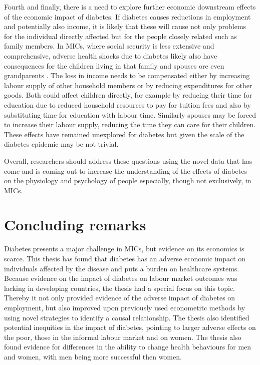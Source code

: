 Fourth and finally, there is a need to explore further economic downstream effects of the economic impact of diabetes. If diabetes causes reductions in employment and potentially also income, it is likely that these will cause not only problems for the individual directly affected but for the people closely related such as family members. In \acp{MIC}, where social security is less extensive and comprehensive, adverse health shocks due to diabetes likely also have consequences for the children living in that family and spouses ore even grandparents \parencite{Alam2014}. The loss in income needs to be compensated either by increasing labour supply of other household members or by reducing expenditures for other goods. Both could affect children directly, for example by reducing their time for education due to reduced household resources to pay for tuition fees and also by substituting time for education with labour time. Similarly spouses may be forced to increase their labour supply, reducing the time they can care for their children. These effects have remained unexplored for diabetes but given the scale of the diabetes epidemic may be not trivial.

Overall, researchers should address these questions using the novel data that has come and is coming out to increase the understanding of the effects of diabetes on the physiology and psychology of people especially, though not exclusively, in \acp{MIC}.


\section{Concluding remarks}

Diabetes presents a major challenge in \acp{MIC}, but evidence on its economics is scarce. This thesis has found that diabetes has an adverse economic impact on individuals affected by the disease and puts a burden on healthcare systems. Because evidence on the impact of diabetes on labour market outcomes was lacking in developing countries, the thesis had a special focus on this topic. Thereby it not only provided evidence of the adverse impact of diabetes on employment, but also improved upon previously used econometric methods by using novel strategies to identify a causal relationship. The thesis also identified potential inequities in the impact of diabetes, pointing to larger adverse effects on the poor, those in the informal labour market and on women. The thesis also found evidence for differences in the ability to change health behaviours for men and women, with men being more successful then women. 

